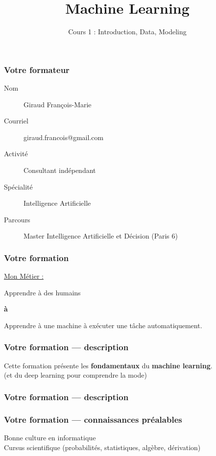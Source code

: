 \documentclass{formation}
\title{Machine Learning}
\subtitle{Cours 1 : Introduction, Data, Modeling}
\begin{document}
\maketitle

\begin{frame}
  \frametitle{Votre formateur}
  \begin{description}
  \item[Nom] Giraud François-Marie
  \item[Courriel] giraud.francois@gmail.com
  \item[Activité] Consultant indépendant
  \item[Spécialité] Intelligence Artificielle
  \item[Parcours] Master Intelligence Artificielle et Décision (Paris 6)
  \end{description}
\end{frame}

\begin{frame}
  \frametitle{Votre formation}
  \begin{center}\underline{Mon Métier :}\end{center}
  \begin{center}Apprendre à des humains\end{center}
  \begin{center}\textbf{à}\end{center}
  \begin{center}Apprendre à une machine à exécuter une tâche automatiquement.\end{center}
\end{frame}

\begin{frame}
  \frametitle{Votre formation — description}
  Cette formation présente les \textbf{fondamentaux} du \textbf{machine learning}. \\(et du deep learning pour comprendre la mode)
\end{frame}

\begin{frame}
  \frametitle{Votre formation — description}
\end{frame}

\begin{frame}
  \frametitle{Votre formation — connaissances préalables}
  Bonne culture en informatique \\
  Cursus scientifique (probabilités, statistiques, algèbre, dérivation)
\end{frame}
\end{document}
